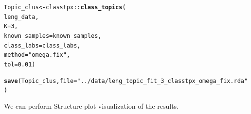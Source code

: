 \documentclass[12pt]{article}\usepackage[]{graphicx}\usepackage[usenames,dvipsnames]{color}
\makeatletter
\newcommand{\hlnum}[1]{\textcolor[rgb]{0.686,0.059,0.569}{#1}}%
\newcommand{\hlstr}[1]{\textcolor[rgb]{0.192,0.494,0.8}{#1}}%
\newcommand{\hlopt}[1]{\textcolor[rgb]{0,0,0}{#1}}%
\newcommand{\hlstd}[1]{\textcolor[rgb]{0.345,0.345,0.345}{#1}}%
\newcommand{\hlkwb}[1]{\textcolor[rgb]{0.69,0.353,0.396}{#1}}%
\newcommand{\hlkwc}[1]{\textcolor[rgb]{0.333,0.667,0.333}{#1}}%
\newcommand{\hlkwd}[1]{\textcolor[rgb]{0.737,0.353,0.396}{\textbf{#1}}}%
\newenvironment{kframe}{%
 \def\at@end@of@kframe{}%
 \ifinner\ifhmode%
  \def\at@end@of@kframe{\end{minipage}}%
  \begin{minipage}{\columnwidth}%
 \fi\fi%
 \def\FrameCommand##1{\hskip\@totalleftmargin \hskip-\fboxsep
 \colorbox{shadecolor}{##1}\hskip-\fboxsep
     \hskip-\linewidth \hskip-\@totalleftmargin \hskip\columnwidth}%
 \MakeFramed {\advance\hsize-\width
   \@totalleftmargin\z@ \linewidth\hsize
   \@setminipage}}%
 {\par\unskip\endMakeFramed%
 \at@end@of@kframe}
\newenvironment{knitrout}{}{} %
\makeatother
\begin{document}
\begin{knitrout}
\color{fgcolor}\begin{kframe}
\begin{alltt}
\hlstd{Topic_clus} \hlkwb{<-} \hlstd{classtpx}\hlopt{::}\hlkwd{class_topics}\hlstd{(}
    \hlstd{leng_data,}
    \hlkwc{K}\hlstd{=}\hlnum{3}\hlstd{,}
    \hlkwc{known_samples} \hlstd{= known_samples,}
    \hlkwc{class_labs} \hlstd{= class_labs,}
    \hlkwc{method}\hlstd{=}\hlstr{"omega.fix"}\hlstd{,}
    \hlkwc{tol}\hlstd{=}\hlnum{0.01}\hlstd{)}

\hlkwd{save}\hlstd{(Topic_clus,} \hlkwc{file}\hlstd{=}\hlstr{"../data/leng_topic_fit_3_classtpx_omega_fix.rda"}\hlstd{)}
\end{alltt}
\end{kframe}
\end{knitrout}

We can perform Structure plot visualization of the results.
\end{document}
